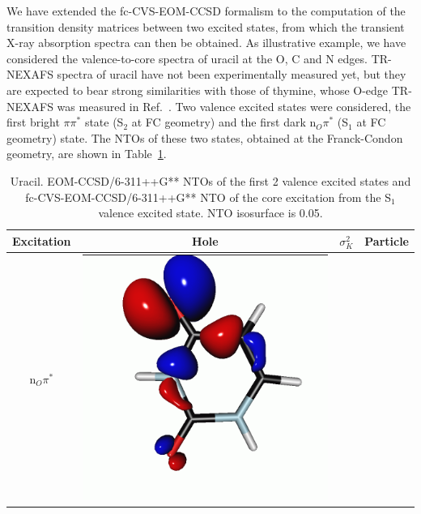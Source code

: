 \documentclass[journal=jctcce,manuscript=article]{achemso}
\begin{document}
We have extended the fc-CVS-EOM-CCSD formalism to the computation of  the transition density matrices between two excited states,
from which the transient X-ray absorption spectra can then be obtained.
As illustrative example, we have considered the valence-to-core spectra of uracil at the O, C and N edges. TR-NEXAFS spectra of uracil have not been experimentally measured yet, but they are expected to bear strong similarities with those of thymine, whose O-edge TR-NEXAFS was measured in Ref.~.
Two valence excited states were considered, the first 
bright $\pi\pi^{\ast}$ state (S$_2$ at FC geometry) and the first dark n$_O\pi^{\ast}$ (S$_1$ at FC  geometry) state. The NTOs of these two states,
obtained at the Franck-Condon geometry, are shown in 
Table~\ref{uracil-ntos-valence}.

\begin{table}[H]
 \centering
 \caption{Uracil. EOM-CCSD/6-311++G** NTOs of the first 2 valence excited states and fc-CVS-EOM-CCSD/6-311++G** NTO of the core excitation from the S$_1$ valence excited state. NTO isosurface is 0.05.\label{uracil-ntos-valence}}
 \vspace{3em}
 \begin{tabular}{ c | c c c }
     \hline
     Excitation &  Hole &$\sigma_K^2$& Particle \\
     \hline
     n$_O\pi^*$ &  
     \begin{minipage}{0.2\textwidth}
         \centering
         \includegraphics[scale=0.10]{NTO/Uracil/S0toS1h.png}

\end{minipage}
\end{tabular}
\end{table}
\end{document}
